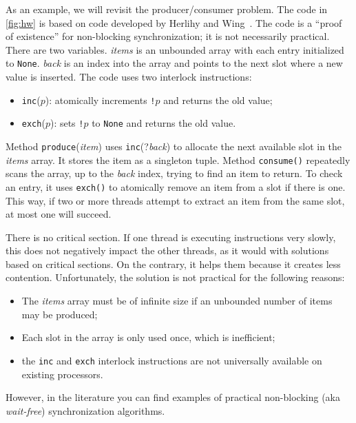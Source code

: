 \documentclass{report}
\begin{document}
As an example, we will revisit the producer/consumer problem.
The code in \autoref{fig:hw} is based on code developed by Herlihy and
Wing~\cite{HW87}.
The code is a ``proof of existence'' for non-blocking synchronization; it
is not necessarily practical.
There are two variables.  \textit{items} is an unbounded array with each
entry initialized to \texttt{None}.  \textit{back} is an index into the
array and points to the next slot where a new value is inserted.
The code uses two interlock instructions:
\begin{itemize}
\item \texttt{inc}($p$): atomically increments \texttt{!}$p$ and returns
the old value;
\item \texttt{exch}($p$): sets \texttt{!}$p$ to \texttt{None} and returns
the old value.
\end{itemize}

Method \texttt{produce}(\textit{item}) uses \texttt{inc}(?\textit{back})
to allocate
the next available slot in the \textit{items} array.
It stores the item as a singleton tuple.
Method \texttt{consume()} repeatedly scans the array, up to the
\textit{back} index, trying to find an item to return.
To check an entry, it uses \texttt{exch()}
to atomically remove an item from a slot if there is one.
This way, if two or more threads attempt to extract an item from
the same slot, at most one will succeed.

There is no critical section.  If one thread is executing instructions
very slowly, this does not negatively impact the other threads, as it
would with solutions based on critical sections.
On the contrary, it helps them because it creates less contention.
Unfortunately, the solution is not practical for the following reasons:
\begin{itemize}
\item The \textit{items} array must be of infinite size if an unbounded number
of items may be produced;
\item Each slot in the array is only used once, which is inefficient;
\item the \texttt{inc} and \texttt{exch} interlock instructions are not
universally available on existing processors.
\end{itemize}
However, in the literature you can find examples of practical
non-blocking (aka \emph{wait-free})
%
synchronization algorithms.

\end{document}
